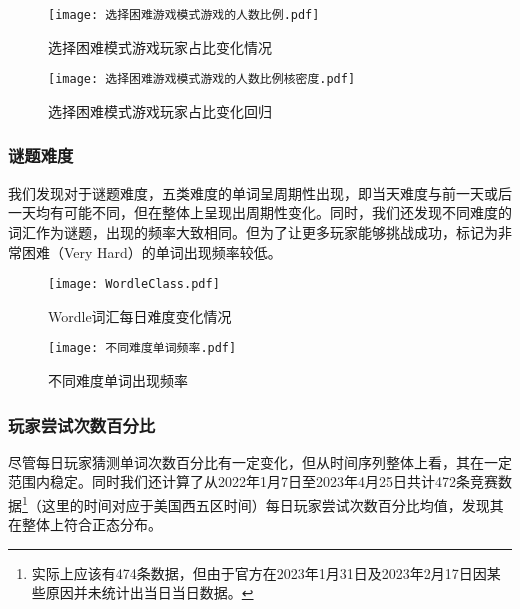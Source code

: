 \documentclass{MathModeling}
\begin{document}
	\begin{figure}[H]
		\centering
		\begin{minipage}{0.48\linewidth}
			\centering
			\texttt{[image: 选择困难游戏模式游戏的人数比例.pdf]}
			\caption{选择困难模式游戏玩家占比变化情况}
			\label{fig:选择困难模式游戏玩家占比变化}
		\end{minipage}
		\begin{minipage}{0.48\linewidth}
			\centering
			\texttt{[image: 选择困难游戏模式游戏的人数比例核密度.pdf]}
			\caption{选择困难模式游戏玩家占比变化回归}
			\label{fig:选择困难模式游戏玩家占比变化回归}
		\end{minipage}
	\end{figure}

	\subsubsection{谜题难度}
	我们发现对于谜题难度，五类难度的单词呈周期性出现，即当天难度与前一天或后一天均有可能不同，但在整体上呈现出周期性变化。同时，我们还发现不同难度的词汇作为谜题，出现的频率大致相同。但为了让更多玩家能够挑战成功，标记为非常困难（Very Hard）的单词出现频率较低。

	\begin{figure}[H]
		\centering
		\begin{minipage}{0.48\linewidth}
			\centering
			\texttt{[image: WordleClass.pdf]}
			\caption{Wordle词汇每日难度变化情况}
			\label{fig:WordleClass}
		\end{minipage}
		\begin{minipage}{0.48\linewidth}
			\centering
			\texttt{[image: 不同难度单词频率.pdf]}
			\caption{不同难度单词出现频率}
			\label{fig:不同难度单词频率}
		\end{minipage}
	\end{figure}

	\subsubsection{玩家尝试次数百分比}
	尽管每日玩家猜测单词次数百分比有一定变化，但从时间序列整体上看，其在一定范围内稳定。同时我们还计算了从2022年1月7日至2023年4月25日共计472条竞赛数据\textcolor{blue}{\footnote{实际上应该有474条数据，但由于官方在2023年1月31日及2023年2月17日因某些原因并未统计出当日当日数据。}}（这里的时间对应于美国西五区时间）每日玩家尝试次数百分比均值，发现其在整体上符合正态分布。
\end{document}
